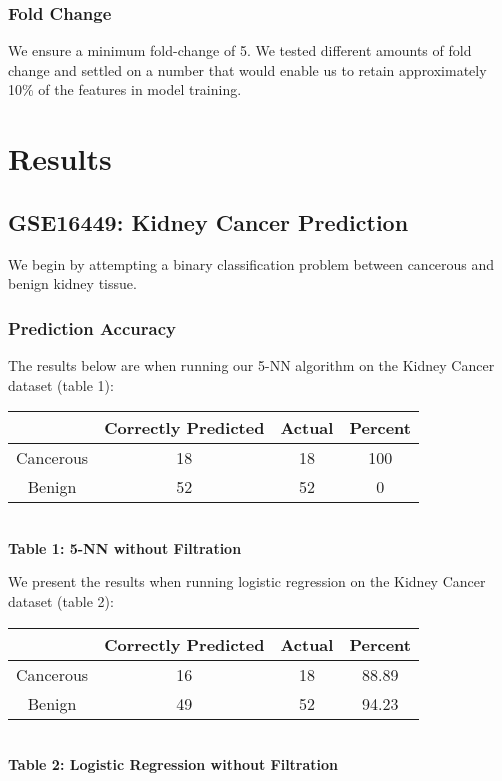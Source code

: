 \documentclass[12pt]{scrartcl}
\begin{document}
    \subsubsection{Fold Change}
We ensure a minimum fold-change of 5. We tested different amounts of fold change and settled on a number that would enable us to retain approximately 10\% of the features in model training.

    \section{Results}
    \subsection{GSE16449: Kidney Cancer Prediction}
    We begin by attempting a binary classification problem between cancerous and benign kidney tissue. 
    \subsubsection{Prediction Accuracy}
    The results below are when running our 5-NN algorithm on the Kidney Cancer dataset (table 1):
   \begin{center}
   \begin{tabular}{c|c|c|c}
   \hline
   & Correctly Predicted & Actual & Percent\\
   \hline
   Cancerous & 18 & 18 & 100\\
   Benign & 52 & 52 & 0\\
   \hline
   \end{tabular}\\
   \vspace{0.1in}
   \textbf{Table 1: 5-NN without Filtration}
    \end{center}
    
    We present the results when running logistic regression on the Kidney Cancer dataset (table 2):
    
    \begin{center}
    \begin{tabular}{c|c|c|c}
    \hline
    & Correctly Predicted & Actual & Percent\\
    \hline
    Cancerous & 16 & 18 & 88.89\\
    Benign & 49 & 52 & 94.23\\
    \hline
    \end{tabular}\\
    \vspace{0.1in}
    \textbf{Table 2: Logistic Regression without Filtration}
    \end{center}
    
\end{document}
